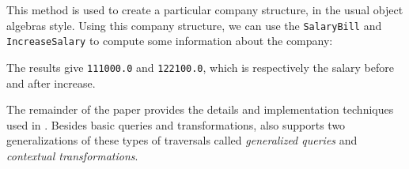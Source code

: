 This method is used to create a particular company structure, in the
usual object algebras style.
Using this company structure, we can use the \lstinline{SalaryBill}
and \lstinline{IncreaseSalary} to compute some information about the company:


The results give \lstinline{111000.0} and \lstinline{122100.0}, which
is respectively the salary before and after increase.

The remainder of the paper provides the details and implementation
techniques used in \Name. Besides basic queries and transformations,
\name also supports two generalizations of these types of traversals
called \emph{generalized queries} and \emph{contextual transformations}.
